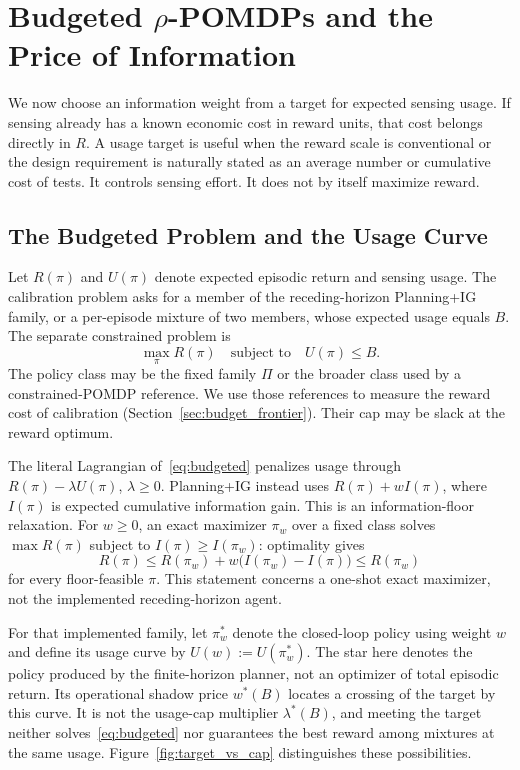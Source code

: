 \documentclass[runningheads]{llncs}
\begin{document}
\section{Budgeted $\rho$-POMDPs and the Price of Information}
\label{sec:budget}

We now choose an information weight from a target for expected sensing usage. If sensing already has a known economic cost in reward units, that cost belongs directly in $R$. A usage target is useful when the reward scale is conventional or the design requirement is naturally stated as an average number or cumulative cost of tests. It controls sensing effort. It does not by itself maximize reward.

\subsection{The Budgeted Problem and the Usage Curve}
\label{sec:budget_theory}

Let $R(\pi)$ and $U(\pi)$ denote expected episodic return and sensing usage. The calibration problem asks for a member of the receding-horizon Planning+IG family, or a per-episode mixture of two members, whose expected usage equals $B$. The separate constrained problem is
\begin{equation}
\label{eq:budgeted}
\max_\pi R(\pi)\quad\text{subject to}\quad U(\pi)\le B.
\end{equation}
The policy class may be the fixed family $\Pi$ or the broader class used by a constrained-POMDP reference. We use those references to measure the reward cost of calibration (Section~\ref{sec:budget_frontier}). Their cap may be slack at the reward optimum.

The literal Lagrangian of~\eqref{eq:budgeted} penalizes usage through $R(\pi)-\lambda U(\pi)$, $\lambda\ge0$. Planning+IG instead uses $R(\pi)+wI(\pi)$, where $I(\pi)$ is expected cumulative information gain. This is an information-floor relaxation. For $w\ge0$, an exact maximizer $\pi_w$ over a fixed class solves $\max R(\pi)$ subject to $I(\pi)\ge I(\pi_w)$: optimality gives
\[
R(\pi)\le R(\pi_w)+w\big(I(\pi_w)-I(\pi)\big)\le R(\pi_w)
\]
for every floor-feasible $\pi$. This statement concerns a one-shot exact maximizer, not the implemented receding-horizon agent.

For that implemented family, let $\pi^*_w$ denote the closed-loop policy using weight $w$ and define its usage curve by $U(w):=U(\pi^*_w)$. The star here denotes the policy produced by the finite-horizon planner, not an optimizer of total episodic return. Its operational shadow price $w^*(B)$ locates a crossing of the target by this curve. It is not the usage-cap multiplier $\lambda^*(B)$, and meeting the target neither solves~\eqref{eq:budgeted} nor guarantees the best reward among mixtures at the same usage. Figure~\ref{fig:target_vs_cap} distinguishes these possibilities.
\end{document}
